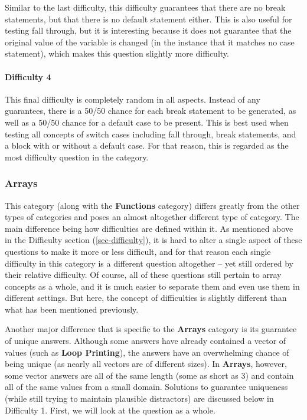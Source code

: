 \documentclass{article}
\begin{document}
Similar to the last difficulty, this difficulty guarantees that there are no break statements, but that there is no default statement either. This is also useful for testing fall through, but it is 
interesting because it does not guarantee that the original value of the variable is changed (in the instance that it matches no case statement), which makes this question slightly more 
difficulty.

\paragraph{Difficulty 4} \hfill \par

This final difficulty is completely random in all aspects. Instead of any guarantees, there is a 50/50 chance for each break statement to be generated, as well as a 50/50 chance for a default 
case to be present. This is best used when testing all concepts of switch cases including fall through, break statements, and a block with or without a default case. For that reason, this is 
regarded as the most difficulty question in the category. 

\subsubsection{Arrays} \label{subsubsec-arrays}

This category (along with the \textbf{Functions} category) differs greatly from the other types of categories and poses an almost altogether different type of category. The main difference being how difficulties are defined within it. As mentioned above in the Difficulty section (\ref{sec-difficulty}), it is hard to alter a single aspect of these questions to make it more or less difficult, and
for that reason each single difficulty in this category is a different question altogether -- yet still ordered by their relative difficulty. Of course, all of these questions still pertain to array concepts
as a whole, and it is much easier to separate them and even use them in different settings. But here, the concept of difficulties is slightly different than what has been mentioned previously. 

Another major difference that is specific to the \textbf{Arrays} category is its guarantee of unique answers. Although some answers have already contained a vector of values (such as \textbf{Loop Printing}), 
the answers have an overwhelming chance of being unique (as nearly all vectors are of different sizes). In \textbf{Arrays}, however, some vector answers are all of the same length (some as short as 3) and contain all of the same values from a small domain. Solutions to guarantee uniqueness (while still trying to maintain plausible distractors) are discussed below in Difficulty 1. First, we will look
at the question as a whole.
\end{document}
